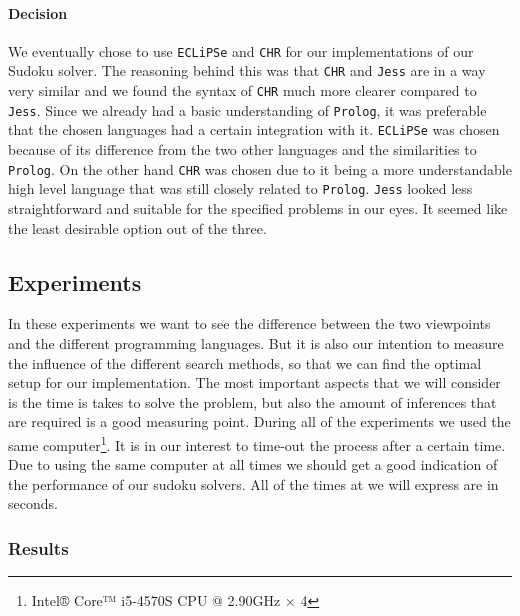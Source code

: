 \paragraph*{Decision}
We eventually chose to use \texttt{ECLiPSe} and \texttt{CHR} for our implementations of our Sudoku solver.
The reasoning behind this was that \texttt{CHR} and \texttt{Jess} are in a way very similar and we found the syntax of \texttt{CHR} much more clearer compared to \texttt{Jess}.
Since we already had a basic understanding of \texttt{Prolog}, it was preferable that the chosen languages had a certain integration with it.
\texttt{ECLiPSe} was chosen because of its difference from the two other languages and the similarities to \texttt{Prolog}.
On the other hand \texttt{CHR} was chosen due to it being a more understandable high level language that was still closely related to \texttt{Prolog}.
\texttt{Jess} looked less straightforward and suitable for the specified problems in our eyes.
It seemed like the least desirable option out of the three.


\subsection{Experiments}\label{subsec:sudokuexperiments}
In these experiments we want to see the difference between the two viewpoints and the different programming languages.
But it is also our intention to measure the influence of the different search methods, so that we can find the optimal setup for our implementation.
The most important aspects that we will consider is the time is takes to solve the problem, but also the amount of inferences that are required is a good measuring point.
During all of the experiments we used the same computer\footnote{Intel® Core™ i5-4570S CPU @ 2.90GHz × 4 }.
It is in our interest to time-out the process after a certain time.
Due to using the same computer at all times we should get a good indication of the performance of our sudoku solvers.
All of the times at we will express are in seconds.

\subsubsection{Results}
